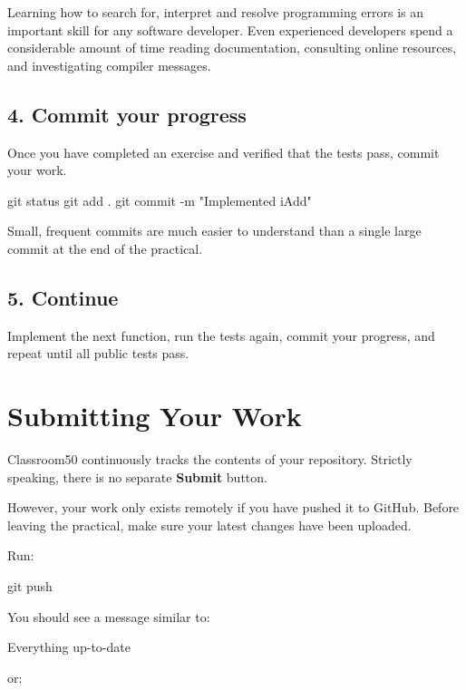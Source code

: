 \documentclass{csc2059practical}
\begin{document}
\begin{tipbox}
Learning how to search for, interpret and resolve programming errors is an important skill for any software developer. Even experienced developers spend a considerable amount of time reading documentation, consulting online resources, and investigating compiler messages.
\end{tipbox}

\subsection{4. Commit your progress}

Once you have completed an exercise and verified that the tests pass, commit your work.

\begin{bashcode}
git status
git add .
git commit -m "Implemented iAdd"
\end{bashcode}

Small, frequent commits are much easier to understand than a single large commit at the end of the practical.

\subsection{5. Continue}

Implement the next function, run the tests again, commit your progress, and repeat until all public tests pass.

\section{Submitting Your Work}

Classroom50 continuously tracks the contents of your repository. Strictly speaking, there is no separate \textbf{Submit} button.

However, your work only exists remotely if you have pushed it to GitHub. Before leaving the practical, make sure your latest changes have been uploaded.

Run:

\begin{bashcode}
git push
\end{bashcode}

You should see a message similar to:

\begin{terminal}
Everything up-to-date
\end{terminal}

or:
\end{document}
